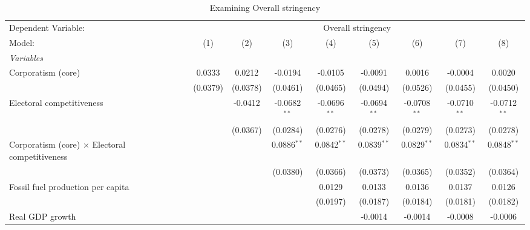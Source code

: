 
\begin{table}[htbp]
   \caption{Examining Overall stringency}
   \centering
   \begin{tabular}{lcccccccc}
      \tabularnewline \midrule \midrule
      Dependent Variable: & \multicolumn{8}{c}{Overall stringency}\\
      Model:                                                 & (1)      & (2)      & (3)            & (4)            & (5)            & (6)            & (7)            & (8)\\  
      \midrule
      \emph{Variables}\\
      Corporatism (core)                                     & 0.0333   & 0.0212   & -0.0194        & -0.0105        & -0.0091        & 0.0016         & -0.0004        & 0.0020\\   
                                                             & (0.0379) & (0.0378) & (0.0461)       & (0.0465)       & (0.0494)       & (0.0526)       & (0.0455)       & (0.0450)\\   
      Electoral competitiveness                              &          & -0.0412  & -0.0682$^{**}$ & -0.0696$^{**}$ & -0.0694$^{**}$ & -0.0708$^{**}$ & -0.0710$^{**}$ & -0.0712$^{**}$\\   
                                                             &          & (0.0367) & (0.0284)       & (0.0276)       & (0.0278)       & (0.0279)       & (0.0273)       & (0.0278)\\   
      Corporatism (core) $\times$ Electoral competitiveness  &          &          & 0.0886$^{**}$  & 0.0842$^{**}$  & 0.0839$^{**}$  & 0.0829$^{**}$  & 0.0834$^{**}$  & 0.0848$^{**}$\\   
                                                             &          &          & (0.0380)       & (0.0366)       & (0.0373)       & (0.0365)       & (0.0352)       & (0.0364)\\   
      Fossil fuel production per capita                      &          &          &                & 0.0129         & 0.0133         & 0.0136         & 0.0137         & 0.0126\\   
                                                             &          &          &                & (0.0197)       & (0.0187)       & (0.0184)       & (0.0181)       & (0.0182)\\   
      Real GDP growth                                        &          &          &                &                & -0.0014        & -0.0014        & -0.0008        & -0.0006\\   

\end{tabular}
\end{table}
